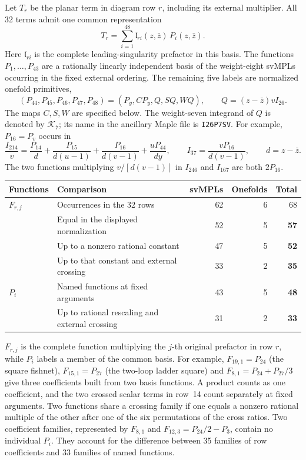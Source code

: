 \label{app:pure-families}
Let \(T_r\) be the planar term in diagram row \(r\), including its external multiplier.
All 32 terms admit one common representation
\[
 \boxed{\displaystyle T_r=\sum_{i=1}^{48}\mathfrak{l}_{ri}(z,\bar z)\,P_i(z,\bar z).}
\]
Here \(\mathfrak{l}_{ri}\) is the complete leading-singularity prefactor in
this basis. The functions \(P_1,\ldots,P_{43}\) are a rationally linearly
independent basis of the weight-eight svMPLs occurring in the fixed external
ordering. The remaining five labels are normalized onefold primitives,
\[
 (P_{44},P_{45},P_{46},P_{47},P_{48})=(P_y,CP_y,Q,SQ,WQ),
 \qquad Q=(z-\bar z)v I_{26}.
\]
The maps \(C,S,W\) are specified below. The weight-seven integrand of \(Q\)
is denoted by \(\mathcal K_7\); its name in the ancillary Maple file is
\texttt{I26P7SV}. For example, \(P_{16}=P_v\) occurs in
\[
 \frac{I_{214}}v=\frac{P_{14}}d+
 \frac{P_{15}}{d(u-1)}+\frac{P_{16}}{d(v-1)}+\frac{uP_{44}}{d y},
 \qquad I_{37}=\frac{vP_{16}}{d(v-1)},\qquad d=z-\bar z .
\]
The two functions multiplying \(v/[d(v-1)]\) in \(I_{246}\) and \(I_{167}\)
are both \(2P_{16}\).
\begin{center}
\begin{tabular}{@{}llrrr@{}}\toprule
Functions & Comparison & svMPLs & Onefolds & Total\\\midrule
\(F_{r,j}\) & Occurrences in the 32 rows & 62 & 6 & 68\\
 & Equal in the displayed normalization & 52 & 5 & \textbf{57}\\
 & Up to a nonzero rational constant & 47 & 5 & \textbf{52}\\
 & Up to that constant and external crossing & 33 & 2 & \textbf{35}\\\midrule
\(P_i\) & Named functions at fixed arguments & 43 & 5 & \textbf{48}\\
 & Up to rational rescaling and external crossing & 31 & 2 & \textbf{33}\\
\bottomrule\end{tabular}
\end{center}
\(F_{r,j}\) is the complete function multiplying the \(j\)-th original prefactor
in row \(r\), while \(P_i\) labels a member of the common basis. For example,
\(F_{19,1}=P_{24}\) (the square fishnet), \(F_{15,1}=P_{27}\) (the two-loop ladder
square) and \(F_{8,1}=P_{24}+P_{27}/3\) give three coefficients built from two
basis functions. A product counts as one coefficient, and the two crossed scalar
terms in row~14 count separately at fixed arguments. Two functions share a crossing
family if one equals a nonzero rational multiple of the other after one of the six
permutations of the cross ratios. Two coefficient families, represented by
\(F_{8,1}\) and \(F_{12,3}=P_{24}/2-P_3\), contain no individual \(P_i\).
They account for the difference between 35 families of row coefficients and 33
families of named functions.

